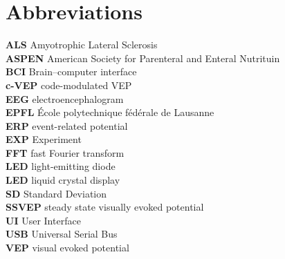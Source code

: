 \chapter{Abbreviations}
\textbf{ALS} Amyotrophic Lateral Sclerosis\\
\textbf{ASPEN}	American Society for Parenteral and Enteral Nutrituin\\
\textbf{BCI}	Brain–computer interface\\
\textbf{c-VEP}	code-modulated VEP\\
\textbf{EEG}	electroencephalogram\\
\textbf{EPFL}	École polytechnique fédérale de Lausanne\\
\textbf{ERP}	event-related potential\\
\textbf{EXP}	Experiment\\
\textbf{FFT}	fast Fourier transform\\
\textbf{LED}	light-emitting diode\\
\textbf{LED}	liquid crystal display\\
\textbf{SD}		Standard Deviation\\
\textbf{SSVEP}	steady state visually evoked potential\\
\textbf{UI}		User Interface\\
\textbf{USB}		Universal Serial Bus\\
\textbf{VEP}		visual evoked potential\\
